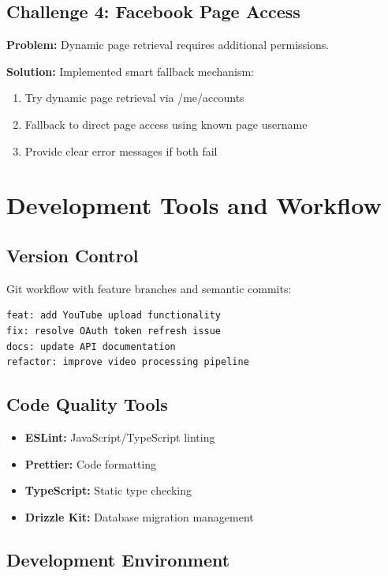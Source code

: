 \subsection{Challenge 4: Facebook Page Access}

\textbf{Problem:} Dynamic page retrieval requires additional permissions.

\textbf{Solution:} Implemented smart fallback mechanism:
\begin{enumerate}
    \item Try dynamic page retrieval via /me/accounts
    \item Fallback to direct page access using known page username
    \item Provide clear error messages if both fail
\end{enumerate}

\section{Development Tools and Workflow}

\subsection{Version Control}

Git workflow with feature branches and semantic commits:
\begin{verbatim}
feat: add YouTube upload functionality
fix: resolve OAuth token refresh issue
docs: update API documentation
refactor: improve video processing pipeline
\end{verbatim}

\subsection{Code Quality Tools}

\begin{itemize}
    \item \textbf{ESLint:} JavaScript/TypeScript linting
    \item \textbf{Prettier:} Code formatting
    \item \textbf{TypeScript:} Static type checking
    \item \textbf{Drizzle Kit:} Database migration management
\end{itemize}

\subsection{Development Environment}

